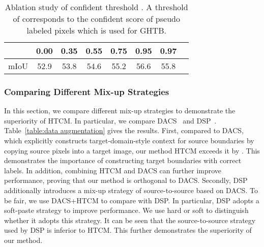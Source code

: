 \documentclass[sigconf]{acmart}
\begin{document}
	\begin{table}[h]
		\def\arraystretch{1.4}
		\setlength{\tabcolsep}{7pt}
		\begin{center}
			\caption{Ablation study of confident threshold . A threshold of  corresponds to the confident score of pseudo labeled pixels which is used for GHTB.}
			\vspace{2mm}
			\begin{tabular}{lccccccc} 
				\hline
				
				   & 0.00   & 0.35 & 0.55 & 0.75 & 0.95 &0.97		\\ \toprule 
				mIoU 			& 52.9 	 & 53.8 & 54.6 & 55.2 &  56.6 &  55.8	\\ \bottomrule
				
			\end{tabular}
			\vspace{2mm}
			\label{table:threshold}
		\end{center}
		
	\end{table}
	
	\subsubsection{Comparing Different Mix-up Strategies}
	
	In this section, we compare different mix-up strategies to demonstrate the superiority of HTCM. In particular, we compare DACS~\cite{tranheden2021dacs} and DSP~\cite{gao2021dsp}. Table~\ref{table:data augmentation} gives the results.
	First, compared to DACS, which explicitly constructs target-domain-style context for source boundaries by copying source pixels into a target image, our method HTCM exceeds it by . This demonstrates the importance of constructing target boundaries with correct labels. In addition, combining HTCM and DACS can further improve performance, proving that our method is orthogonal to DACS.
	Secondly, DSP additionally introduces a mix-up strategy of source-to-source based on DACS. To be fair, we use DACS+HTCM to compare with DSP. In particular, DSP adopts a soft-paste strategy to improve performance. We use hard or soft to distinguish whether it adopts this strategy. It can be seen that the source-to-source strategy used by DSP is inferior to HTCM. This further demonstrates the superiority of our method.
	
	
\end{document}
